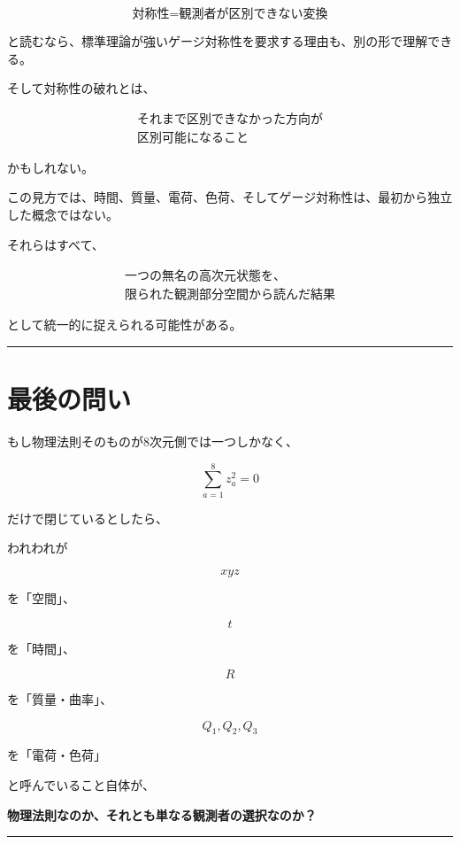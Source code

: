\documentclass[
  a4paper,
]{ltjsarticle}
\begin{document}
\[
\boxed{
\text{対称性}
=
\text{観測者が区別できない変換}
}
\]

と読むなら、標準理論が強いゲージ対称性を要求する理由も、別の形で理解できる。

そして対称性の破れとは、

\[
\boxed{
\begin{array}{c}
\text{それまで区別できなかった方向が}\\
\text{区別可能になること}
\end{array}
}
\]

かもしれない。

この見方では、時間、質量、電荷、色荷、そしてゲージ対称性は、最初から独立した概念ではない。

それらはすべて、

\[
\boxed{
\begin{array}{c}
\text{一つの無名の高次元状態を、}\\
\text{限られた観測部分空間から読んだ結果}
\end{array}
}
\]

として統一的に捉えられる可能性がある。

\begin{center}\rule{0.5\linewidth}{0.5pt}\end{center}

\section{最後の問い}\label{ux6700ux5f8cux306eux554fux3044}

もし物理法則そのものが8次元側では一つしかなく、

\[
\boxed{
\sum_{a=1}^{8} z_a^2=0
}
\]

だけで閉じているとしたら、

われわれが

\[
xyz
\]

を「空間」、

\[
t
\]

を「時間」、

\[
R
\]

を「質量・曲率」、

\[
Q_1,Q_2,Q_3
\]

を「電荷・色荷」

と呼んでいること自体が、

\textbf{物理法則なのか、それとも単なる観測者の選択なのか？}

\begin{center}\rule{0.5\linewidth}{0.5pt}\end{center}
\end{document}
